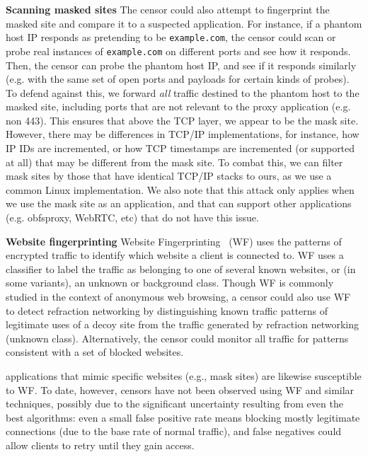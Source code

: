 \documentclass[sigconf]{acmart}
\renewcommand{\paragraph}[1]{\smallskip\noindent\textbf{#1\quad}}
\begin{document}
\paragraph{Scanning masked sites}
The censor could also attempt to fingerprint the masked site and compare it to a
suspected \scheme application. For instance, if a phantom host IP responds as
pretending to be \texttt{example.com}, the censor could scan or probe real instances
of \texttt{example.com} on different ports and see how it responds. Then, the
censor can probe the phantom host IP, and see if it responds similarly (e.g. with
the same set of open ports and payloads for certain kinds of probes). To defend
against this, we forward \emph{all} traffic destined to the phantom host to the
masked site, including ports that are not relevant to the proxy application
(e.g. non 443). This ensures that above the TCP layer, we appear to be the mask
site. However, there may be differences in TCP/IP implementations, for instance,
how IP IDs are incremented, or how TCP timestamps are incremented (or supported
at all) that may be different from the mask site. To combat this, we can filter
mask sites by those that have identical TCP/IP stacks to ours, as we use a
common Linux implementation. We also note that this attack only applies when we
use the mask site as an application, and that \scheme can support other
applications (e.g. obfsproxy, WebRTC, etc) that do not have this issue.



\paragraph{Website fingerprinting}
Website Fingerprinting~\cite{wang2014effective,hayes2016k,sirinam2018deep} (WF) uses the patterns of encrypted traffic to identify which website a client is connected to. WF uses a classifier to label the traffic as belonging to one of several known websites, or (in some variants), an unknown or background class. Though WF is commonly studied in the context of anonymous web browsing, a censor could also use WF to detect refraction networking by distinguishing known traffic patterns of legitimate uses of a decoy site from the traffic generated by refraction networking (unknown class). Alternatively, the censor could monitor all traffic for patterns consistent with a set of blocked websites.

\scheme applications that mimic specific websites (e.g., mask sites) are likewise susceptible to WF. To date, however, censors have not been observed using WF and similar techniques, possibly due to the significant uncertainty resulting from even the best algorithms: even a small false
positive rate means blocking mostly legitimate connections (due to the base rate
of normal traffic), and false negatives could allow clients to retry until they
gain access.
\end{document}
